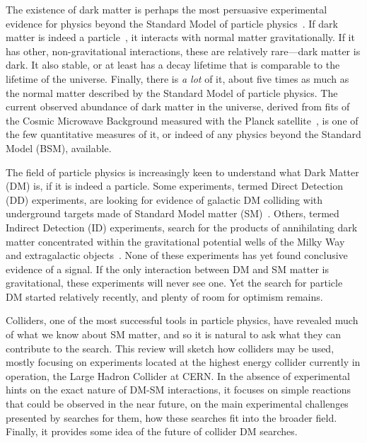 


The existence of dark matter is perhaps the most persuasive experimental evidence for physics beyond the Standard Model of particle physics~\cite{Bertone:2016nfn}. 
If dark matter is indeed a particle~\cite{Steigman:1979kw}, it interacts with normal matter gravitationally. If it has other, non-gravitational interactions, these are relatively rare---dark matter is dark. It also stable, or at least has a decay lifetime that is comparable to the lifetime of the universe. Finally, there is {\it a lot} of it, about five times as much as the normal matter described by the Standard Model of particle physics. The current observed abundance of dark matter in the universe, derived from fits of the Cosmic Microwave Background measured with the Planck satellite~\cite{Ade:2015xua}, is one of the few quantitative measures of it, or indeed of any physics beyond the Standard Model (BSM), available.

The field of particle physics is increasingly keen to understand what Dark Matter (DM) is, if it is indeed a particle. 
Some experiments, termed Direct Detection (DD) experiments, are looking for evidence of galactic DM colliding with underground targets made of Standard Model matter (SM)~\cite{0954-3899-43-1-013001}. Others, termed Indirect Detection (ID) experiments, search for the products of annihilating dark matter concentrated within the gravitational potential wells of the Milky Way and extragalactic objects~\cite{Gaskins:2016cha}. None of these experiments has yet found conclusive evidence of a signal. If the only interaction between DM and SM matter is gravitational, these experiments will never see one. Yet the search for particle DM started relatively recently, and plenty of room for optimism remains.

Colliders, one of the most successful tools in particle physics, have revealed much of what we know about SM matter, and so it is natural to ask what they can contribute to the search.
This review will sketch how colliders may be used, mostly focusing on experiments located at the highest energy collider currently in operation, the Large Hadron Collider at CERN. In the absence of experimental hints on the exact nature of DM-SM interactions, it focuses on simple reactions that could be observed in the near future, on the main experimental challenges presented by searches for them, how these searches fit into the broader field. Finally, it provides some idea of the future of collider DM searches.

